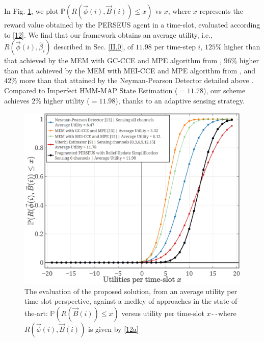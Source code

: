 \documentclass[12pt, draftcls, onecolumn]{IEEEtran}
\begin{document}
In Fig. \ref{Fig. 5}, we plot $\mathbb{P}(R(\vec{\phi}(i), \vec{B}(i)){\leq}x)$ vs $x$, where $x$ represents the reward value obtained by the PERSEUS agent in a time-slot, evaluated according to \eqref{12}. We find that our framework obtains an average utility, i.e., $R(\vec{\phi}(i),\hat{\beta}_{i})$ described in Sec. \ref{II.0}, of $11.98$ per time-step $i$, $125$\% higher than that achieved by the MEM with GC-CCE and MPE algorithm from \cite{WCL:7}, $96$\% higher than that achieved by the MEM with MEI-CCE and MPE algorithm from \cite{WCL:7}, and $42$\% more than that attained by the Neyman-Pearson Detector detailed above \cite{WCL:11}. Compared to Imperfect HMM-MAP State Estimation (${=}11.78$), our scheme achieves $2$\% higher utility (${=}11.98$), thanks to an adaptive sensing strategy.
\begin{figure} [t]
    \centerline{
    \includegraphics[width=0.8\linewidth]{figures/Minerva_Single_Agent_CDF_plot.png}}
    \vspace{-6mm}
    \caption{The evaluation of the proposed solution, from an average utility per time-slot perspective, against a medley of approaches in the state-of-the-art: $\mathbb{P}(R(\vec{B}(i)){\leq}x)$ versus utility per time-slot $x$\texttt{-{}-}where $R(\vec{\phi}(i),\vec{B}(i))$ is given by \eqref{12a}}
    \vspace{-7mm}
    \label{Fig. 5}
\end{figure}
\end{document}
